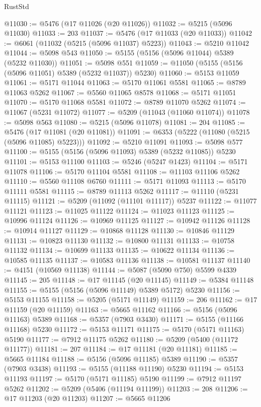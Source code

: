 \begin{lexlean}{RustStd}
\begin{coremodule}
@11030 := @5476 (@17 @11026 (@20 @11026))
@11032 := @5215 (@5096 @11030)
@11033 := 203
@11037 := @5476 (@17 @11033 (@20 @11033))
@11042 := @6061 (@11032 (@5215 (@5096 @11037) @5223))
@11043 := @5210 @11042
@11044 := @5098 @543
@11050 := @5155 (@5156 (@5096 @11044) @5389 (@5232 @11030))
@11051 := @5098 @551
@11059 := @11050 (@5155 (@5156 (@5096 @11051) @5389 (@5232 @11037)) @5230)
@11060 := @5153 @11059
@11061 := @5171 @11044
@11063 := @5170 @11061 @5581
@11065 := @8789 @11063 @5262
@11067 := @5560 @11065 @8578
@11068 := @5171 @11051
@11070 := @5170 @11068 @5581
@11072 := @8789 @11070 @5262
@11074 := @11067 (@5231 @11072)
@11077 := @5209 (@11043 (@11060 @11074))
@11078 := @5098 @563
@11080 := @5215 (@5096 @11078)
@11081 := 204
@11085 := @5476 (@17 @11081 (@20 @11081))
@11091 := @6353 (@5222 (@11080 (@5215 (@5096 @11085) @5223)))
@11092 := @5210 @11091
@11093 := @5098 @577
@11100 := @5155 (@5156 (@5096 @11093) @5389 (@5232 @11085)) @5230
@11101 := @5153 @11100
@11103 := @5246 (@5247 @1423)
@11104 := @5171 @11078
@11106 := @5170 @11104 @5581
@11108 := @11103 @11106 @5262
@11110 := @5560 @11108 @6760
@11111 := @5171 @11093
@11113 := @5170 @11111 @5581
@11115 := @8789 @11113 @5262
@11117 := @11110 (@5231 @11115)
@11121 := @5209 (@11092 (@11101 @11117)) @5237
@11122 := @11077 @11121
@11123 := @11025 @11122
@11124 := @11023 @11123
@11125 := @10996 @11124
@11126 := @10969 @11125
@11127 := @10942 @11126
@11128 := @10914 @11127
@11129 := @10868 @11128
@11130 := @10846 @11129
@11131 := @10823 @11130
@11132 := @10800 @11131
@11133 := @10758 @11132
@11134 := @10699 @11133
@11135 := @10622 @11134
@11136 := @10585 @11135
@11137 := @10583 @11136
@11138 := @10581 @11137
@11140 := @4151 (@10569 @11138)
@11144 := @5087 (@5090 @750) @5599 @4339
@11145 := 205
@11148 := @17 @11145 (@20 @11145)
@11149 := @5384 @11148
@11155 := @5155 (@5156 (@5096 @11149) @5389 @5172) @5230
@11156 := @5153 @11155
@11158 := @5205 (@5171 @11149)
@11159 := 206
@11162 := @17 @11159 (@20 @11159)
@11163 := @5665 @11162
@11166 := @5156 (@5096 @11163) @5389
@11168 := @5357 (@7903 @3430)
@11171 := @5155 (@11166 @11168) @5230
@11172 := @5153 @11171
@11175 := @5170 (@5171 @11163) @5190
@11177 := @7912 @11175 @5262
@11180 := @5209 (@5400 (@11172 @11177))
@11181 := 207
@11184 := @17 @11181 (@20 @11181)
@11185 := @5665 @11184
@11188 := @5156 (@5096 @11185) @5389
@11190 := @5357 (@7903 @3438)
@11193 := @5155 (@11188 @11190) @5230
@11194 := @5153 @11193
@11197 := @5170 (@5171 @11185) @5190
@11199 := @7912 @11197 @5262
@11202 := @5209 (@5406 (@11194 @11199))
@11203 := 208
@11206 := @17 @11203 (@20 @11203)
@11207 := @5665 @11206

\end{coremodule}
\end{lexlean}
